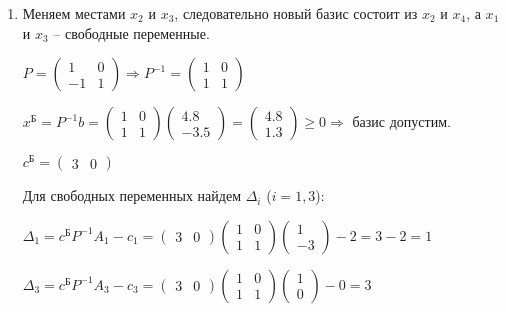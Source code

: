 \begin{enumerate}
Выводим из базиса переменную 
$r = \argmin\limits_j\left( \left. \dfrac{x_j^\text{Б}}{z_j}\right|_{z_j>0} \right) = 3 \Rightarrow x_3$.

\item 
Меняем местами $x_2$ и $x_3$, следовательно новый базис состоит из $x_2$ и $x_4$, а $x_1$ и $x_3$ -- свободные переменные. 

$P = 
\begin{pmatrix}
	1 & 0 \\
	-1 & 1 
\end{pmatrix} \Rightarrow
P^{-1} = 
\begin{pmatrix}
	1 & 0 \\
	1 & 1 
\end{pmatrix}$

$x^\text{Б} = P^{-1}b =
\begin{pmatrix}
	1 & 0 \\
	1 & 1 
\end{pmatrix}
\begin{pmatrix}
	4.8 \\
	-3.5
\end{pmatrix} =
\begin{pmatrix}
	4.8 \\
	1.3
\end{pmatrix} \geq 0
\Rightarrow$ базис допустим.

$c^\text{Б} = 
\begin{pmatrix}
	3 & 0
\end{pmatrix}$

Для свободных переменных найдем $\Delta_i$ ($i = 1, 3$):

$\Delta_1 = c^\text{Б} P^{-1} A_1 - c_1 =
\begin{pmatrix}
	3 & 0
\end{pmatrix}
\begin{pmatrix}
	1 & 0 \\
	1 & 1 
\end{pmatrix}
\begin{pmatrix}
	1 \\
	-3
\end{pmatrix} - 2 = 
3 - 2 = 1$

$\Delta_3 = c^\text{Б} P^{-1} A_3 - c_3 =
\begin{pmatrix}
	3 & 0
\end{pmatrix}
\begin{pmatrix}
	1 & 0 \\
	1 & 1 
\end{pmatrix}
\begin{pmatrix}
	1 \\
	0
\end{pmatrix} - 0 = 3$


\end{enumerate}
